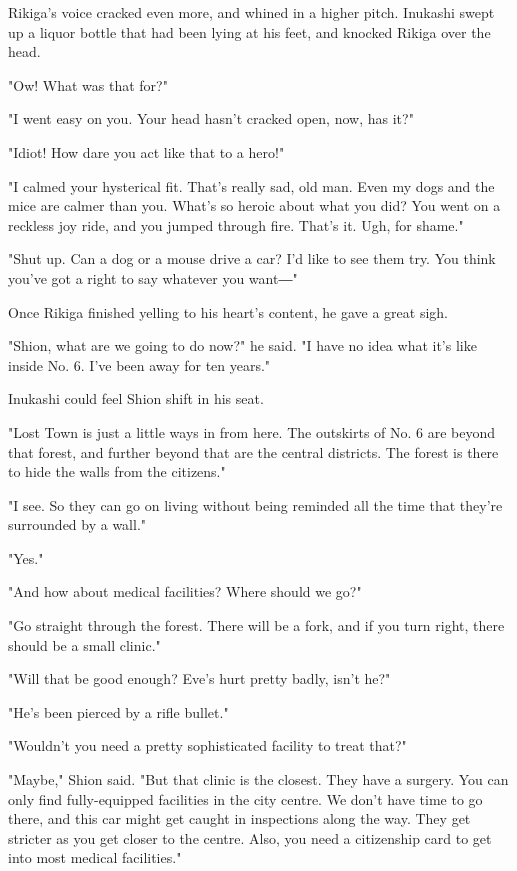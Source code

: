 Rikiga's voice cracked even more, and whined in a higher pitch. Inukashi
swept up a liquor bottle that had been lying at his feet, and knocked
Rikiga over the head.

"Ow! What was that for?"

"I went easy on you. Your head hasn't cracked open, now, has it?"

"Idiot! How dare you act like that to a hero!"

"I calmed your hysterical fit. That's really sad, old man. Even my dogs
and the mice are calmer than you. What's so heroic about what you did?
You went on a reckless joy ride, and you jumped through fire. That's it.
Ugh, for shame."

"Shut up. Can a dog or a mouse drive a car? I'd like to see them try.
You think you've got a right to say whatever you want―"

Once Rikiga finished yelling to his heart's content, he gave a great
sigh.

"Shion, what are we going to do now?" he said. "I have no idea what it's
like inside No. 6. I've been away for ten years."

Inukashi could feel Shion shift in his seat.

"Lost Town is just a little ways in from here. The outskirts of No. 6
are beyond that forest, and further beyond that are the central
districts. The forest is there to hide the walls from the citizens."

"I see. So they can go on living without being reminded all the time
that they're surrounded by a wall."

"Yes."

"And how about medical facilities? Where should we go?"

"Go straight through the forest. There will be a fork, and if you turn
right, there should be a small clinic."

"Will that be good enough? Eve's hurt pretty badly, isn't he?"

"He's been pierced by a rifle bullet."

"Wouldn't you need a pretty sophisticated facility to treat that?"

"Maybe," Shion said. "But that clinic is the closest. They have a
surgery. You can only find fully-equipped facilities in the city centre.
We don't have time to go there, and this car might get caught in
inspections along the way. They get stricter as you get closer to the
centre. Also, you need a citizenship card to get into most medical
facilities."

